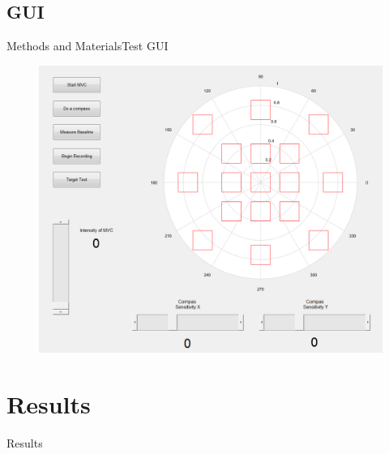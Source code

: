 \documentclass[10pt]{beamer}
\begin{document}
\subsection{GUI}
\begin{frame}{Methods and Materials}{Test GUI}
\begin{figure}
	\includegraphics[scale=0.3]{figures/PlacesToGo.png}
\end{figure}
\end{frame}


\section{Results}
\begin{frame}{Results}

\end{frame}

\end{document}
